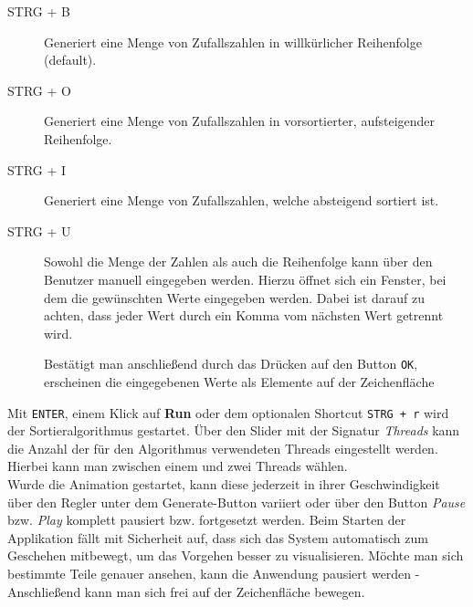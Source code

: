 \begin{description}
\item[STRG + B] Generiert eine Menge von Zufallszahlen in willkürlicher Reihenfolge (default).


\item[STRG + O] Generiert eine Menge von Zufallszahlen in vorsortierter, aufsteigender Reihenfolge.


\item[STRG + I] Generiert eine Menge von Zufallszahlen, welche absteigend sortiert ist.


\item[STRG + U] Sowohl die Menge der Zahlen als auch die Reihenfolge kann über den Benutzer manuell eingegeben werden. Hierzu öffnet sich ein Fenster, bei dem die gewünschten Werte eingegeben werden. Dabei ist darauf zu achten, dass jeder Wert durch ein Komma vom nächsten Wert getrennt wird.


Bestätigt man anschließend durch das Drücken auf den Button \texttt{OK}, erscheinen die eingegebenen Werte als Elemente auf der Zeichenfläche

\end{description}





Mit \texttt{ENTER}, einem Klick auf \textbf{Run} oder dem optionalen Shortcut \texttt{STRG + r} wird der Sortieralgorithmus gestartet. Über den Slider mit der Signatur \textit{Threads} kann die Anzahl der für den Algorithmus verwendeten Threads eingestellt werden. Hierbei kann man zwischen einem und zwei Threads wählen.\\
Wurde die Animation gestartet, kann diese jederzeit in ihrer Geschwindigkeit über den Regler unter dem Generate-Button variiert oder über den Button \textit{Pause} bzw. \textit{Play} komplett pausiert bzw. fortgesetzt werden. Beim Starten der Applikation fällt mit Sicherheit auf, dass sich das System automatisch zum Geschehen mitbewegt, um das Vorgehen besser zu visualisieren. Möchte man sich bestimmte Teile genauer ansehen, kann die Anwendung pausiert werden - Anschließend kann man sich frei auf der Zeichenfläche bewegen.

